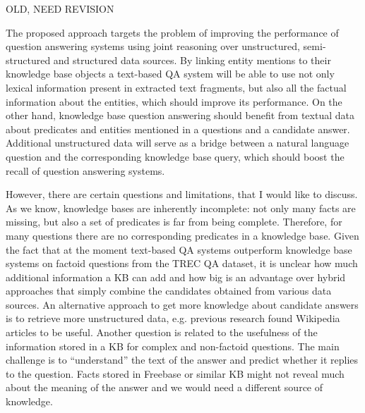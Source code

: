 %


OLD, NEED REVISION

The proposed approach targets the problem of improving the performance of question answering systems using joint reasoning over unstructured, semi-structured and structured data sources.
By linking entity mentions to their knowledge base objects a text-based QA system will be able to use not only lexical information present in extracted text fragments, but also all the factual information about the entities, which should improve its performance.
On the other hand, knowledge base question answering should benefit from textual data about predicates and entities mentioned in a questions and a candidate answer.
Additional unstructured data will serve as a bridge between a natural language question and the corresponding knowledge base query, which should boost the recall of question answering systems.

However, there are certain questions and limitations, that I would like to discuss.
As we know, knowledge bases are inherently incomplete: not only many facts are missing, but also a set of predicates is far from being complete.
Therefore, for many questions there are no corresponding predicates in a knowledge base.
Given the fact that at the moment text-based QA systems outperform knowledge base systems on factoid questions from the TREC QA dataset, it is unclear how much additional information a KB can add and how big is an advantage over hybrid approaches that simply combine the candidates obtained from various data sources.
An alternative approach to get more knowledge about candidate answers is to retrieve more unstructured data, e.g. previous research found Wikipedia articles to be useful.
Another question is related to the usefulness of the information stored in a KB for complex and non-factoid questions.
The main challenge is to ``understand'' the text of the answer and  predict whether it replies to the question.
Facts stored in Freebase or similar KB might not reveal much about the meaning of the answer and we would need a different source of knowledge.


